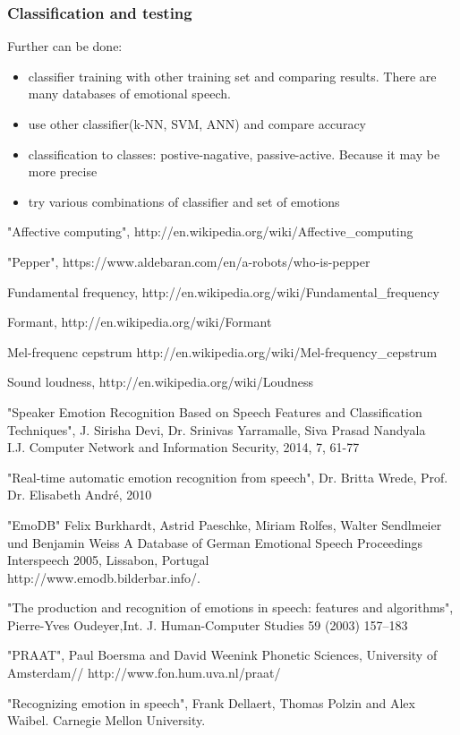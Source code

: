\documentclass[14pt]{extarticle}
\begin{document}
\subsubsection{Classification and testing}
Further can be done:
\begin{itemize}
	\item classifier training with other training set and comparing results. There are many databases of emotional speech.
	\item use other classifier(k-NN, SVM, ANN) and compare accuracy
	\item classification to classes: postive-nagative, passive-active. Because it may be more precise
	\item try various combinations of classifier and set of emotions
\end{itemize}
\begin{thebibliography}{9}

"Affective computing",
http://en.wikipedia.org/wiki/Affective\_computing

"Pepper",
https://www.aldebaran.com/en/a-robots/who-is-pepper

Fundamental frequency,
http://en.wikipedia.org/wiki/Fundamental\_frequency

Formant,
http://en.wikipedia.org/wiki/Formant

Mel-frequenc cepstrum
http://en.wikipedia.org/wiki/Mel-frequency\_cepstrum

Sound loudness,
http://en.wikipedia.org/wiki/Loudness


"Speaker Emotion Recognition Based on Speech Features and Classification Techniques",
J. Sirisha Devi, Dr. Srinivas Yarramalle, Siva Prasad Nandyala\\
I.J. Computer Network and Information Security, 2014, 7, 61-77

 "Real-time automatic emotion recognition
from speech",
 Dr. Britta Wrede, Prof. Dr. Elisabeth André, 2010

"EmoDB" Felix Burkhardt, Astrid Paeschke, Miriam Rolfes, Walter Sendlmeier und Benjamin Weiss
A Database of German Emotional Speech
Proceedings Interspeech 2005, Lissabon, Portugal\\
http://www.emodb.bilderbar.info/.

"The production and recognition of emotions in
speech: features and algorithms",
 Pierre-Yves Oudeyer,Int. J. Human-Computer Studies 59 (2003) 157–183

 "PRAAT",
 Paul Boersma and David Weenink   
Phonetic Sciences, University of Amsterdam//
http://www.fon.hum.uva.nl/praat/

"Recognizing emotion in speech",
Frank Dellaert, Thomas Polzin and Alex Waibel. Carnegie Mellon University. 


\end{thebibliography}
\end{document}
